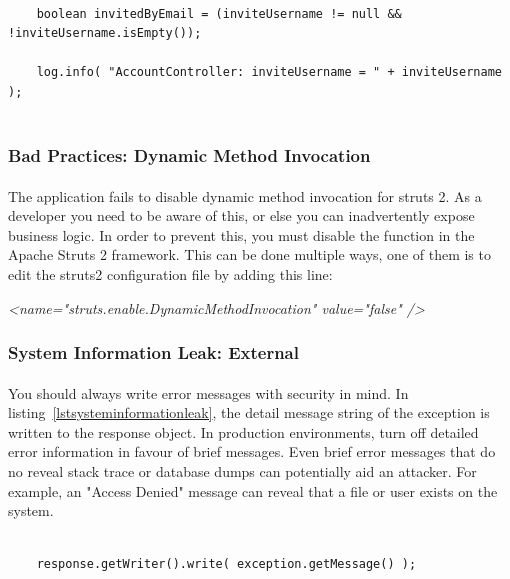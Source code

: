 \documentclass[11pt,english,a4paper]{report}
\begin{document}
\begin{lstlisting}[caption=Log forging in the AccountController class, label=lstlogforging]
	
	boolean invitedByEmail = (inviteUsername != null && !inviteUsername.isEmpty());

	log.info( "AccountController: inviteUsername = " + inviteUsername );


\end{lstlisting}

\subsubsection{Bad Practices: Dynamic Method Invocation}
\paragraph{}
The application fails to disable dynamic method invocation for struts 2.
As a developer you need to be aware of this, or else you can inadvertently expose business logic.
In order to prevent this, you must disable the function in the Apache Struts 2 framework.
This can be done multiple ways, one of them is to edit the struts2 configuration file by adding this line:
\begin{center}
	\textit{\textless name="struts.enable.DynamicMethodInvocation" value="false" /\textgreater }

\end{center}



\subsubsection{System Information Leak: External}
\paragraph{}
You should always write error messages with security in mind.
In listing~\ref{lstsysteminformationleak}, the detail message string of the exception is written to the response object.
In production environments, turn off detailed error information in favour of brief messages.
Even brief error messages that do no reveal stack trace or database dumps can potentially aid an attacker. 
For example, an "Access Denied" message can reveal that a file or user exists on the system.

\begin{lstlisting}[caption=Parts of the method mapException, label=lstsysteminformationleak]
	
	response.getWriter().write( exception.getMessage() );

	
\end{lstlisting}
\end{document}
